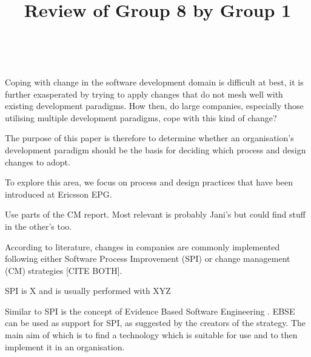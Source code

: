 \documentclass[times, 10pt,twocolumn]{IEEEtran}
\begin{document}
\title{Review of Group 8 by Group 1}

\author{


}


\maketitle
\thispagestyle{empty}



​

Coping with change in the software development domain is difficult at best, it is further exasperated by trying to apply changes that do not mesh well with existing development paradigms. How then, do large companies, especially those utilising multiple development paradigms, cope with this kind of change?

The purpose of this paper is therefore to determine whether an organisation's development paradigm should be the basis for deciding which process and design changes to adopt. 

To explore this area, we focus on process and design practices that have been introduced at Ericsson EPG.


Use parts of the CM report. 
Most relevant is probably Jani's but could find stuff in the other's too. 

According to literature, changes in companies are commonly implemented following either Software Process Improvement (SPI) or change management (CM) strategies [CITE BOTH].

SPI is X and is usually performed with XYZ

Similar to SPI is the concept of Evidence Based Software Engineering \cite{dyba2005evidence}. EBSE can be used as support for SPI, as suggested by the creators of the strategy. The main aim of which is to find a technology which is suitable for use and to then implement it in an organisation.
\end{document}
